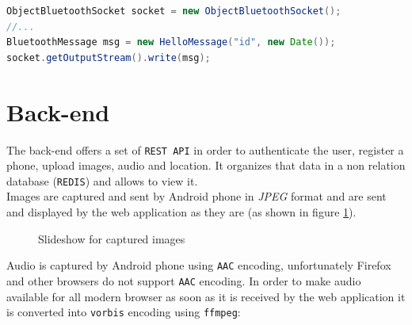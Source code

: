 \documentclass[conference, 11pt]{IEEEtran}
\begin{document}
\begin{lstlisting}[language=Java, caption=Bluetooth sending of an HelloMessage]
ObjectBluetoothSocket socket = new ObjectBluetoothSocket();
//...
BluetoothMessage msg = new HelloMessage("id", new Date());
socket.getOutputStream().write(msg);

\end{lstlisting}


\section{\textbf{Back-end}}
The back-end offers a set of \texttt{REST API} in order to authenticate the user, register a phone, upload images, audio and location. It organizes that data in a non relation database (\texttt{REDIS}) and allows to view it.\\

Images are captured and sent by Android phone in \textit{JPEG} format and are sent and displayed by the web application as they are (as shown in figure \ref{img:slideshow}).\\

\begin{figure}[!ht]
\begin{center}
\caption{Slideshow for captured images}
\label{img:slideshow}
\end{center}
\end{figure}

Audio is captured by Android phone using \texttt{AAC} encoding, unfortunately Firefox and other browsers do not support \texttt{AAC} encoding. In order to make audio available for all modern browser as soon as it is received by the web application it is converted into \texttt{vorbis} encoding using \texttt{ffmpeg}:
\end{document}
